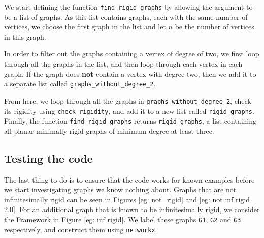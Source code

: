 \begin{flushleft}
We start defining the function \texttt{find\_rigid\_graphs} by allowing the argument to be a list of graphs. As this list contains graphs, each with the same number of vertices, we choose the first graph in the list and let $n$ be the number of vertices in this graph. 
\end{flushleft}

\begin{flushleft}
In order to filter out the graphs containing a vertex of degree of two, we first loop through all the graphs in the list, and then loop through each vertex in each graph. If the graph does \textbf{not} contain a vertex with degree two, then we add it to a separate list called \texttt{graphs\_without\_degree\_2}. 
\end{flushleft}

\begin{flushleft}
From here, we loop through all the graphs in \texttt{graphs\_without\_degree\_2}, check its rigidity using \texttt{check\_rigidity}, and add it to a new list called \texttt{rigid\_graphs}. Finally, the function \texttt{find\_rigid\_graphs} returns \texttt{rigid\_graphs}, a list containing all planar minimally rigid graphs of minimum degree at least three.
\end{flushleft}

\subsection{Testing the code}

\begin{flushleft}
The last thing to do is to ensure that the code works for known examples before we start investigating graphs we know nothing about. Graphs that are not infinitesimally rigid can be seen in Figures \ref{eg: not_rigid} and \ref{eg: not inf rigid 2.0}. For an additional graph that is known to be infinitesimally rigid, we consider the Framework in Figure \ref{eg: inf rigid}. We label these graphs \texttt{G1}, \texttt{G2} and \texttt{G3} respectively, and construct them using \texttt{networkx}.
\end{flushleft}

